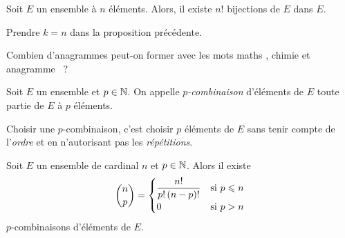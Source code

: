 \documentclass{magnolia}
\begin{document}
\begin{proposition}
Soit $E$ un ensemble à $n$ éléments. Alors, il existe $n!$ bijections de
$E$ dans $E$.  
\end{proposition}

\begin{preuve}
Prendre $k=n$ dans la proposition précédente.
\end{preuve}

\begin{exoUnique}
\exo Combien d'anagrammes peut-on former avec les mots \og maths \fg, \og chimie \fg et
  \og anagramme \fg~?
\end{exoUnique}

\begin{definition}[nom={$p$-combinaisons}]
Soit $E$ un ensemble et $p\in\mathbb{N}$. On appelle \emph{$p$-combinaison} d'éléments de $E$ toute
partie de $E$ à $p$ éléments.
\end{definition}

\begin{remarqueUnique}
\remarque Choisir une $p$-combinaison, c'est choisir $p$ éléments de $E$ sans tenir compte
  de l'\emph{ordre} et en n'autorisant pas les \emph{répétitions}.
\end{remarqueUnique}

\begin{proposition}[nom={Nombre de combinaisons}]
Soit $E$ un ensemble de cardinal $n$ et $p\in\mathbb{N}$. Alors il existe
\[\binom{n}{p}=
    \begin{cases}
    \displaystyle\frac{n!}{p!\left(n-p\right)!} & \text{si $p\leqslant n$}\\
    0 & {\text{si $p>n$}}
    \end{cases}\]
$p$-combinaisons d'éléments de $E$.
\end{proposition}
\end{document}

